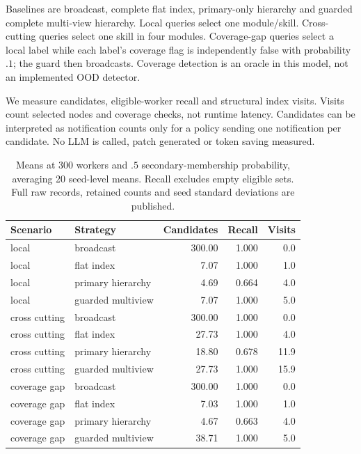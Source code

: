 \documentclass[11pt]{article}
\begin{document}
Baselines are broadcast, complete flat index, primary-only hierarchy and guarded complete multi-view hierarchy. Local queries select one module/skill. Cross-cutting queries select one skill in four modules. Coverage-gap queries select a local label while each label's coverage flag is independently false with probability $.1$; the guard then broadcasts. Coverage detection is an oracle in this model, not an implemented OOD detector.

We measure candidates, eligible-worker recall and structural index visits. Visits count selected nodes and coverage checks, not runtime latency. Candidates can be interpreted as notification counts only for a policy sending one notification per candidate. No LLM is called, patch generated or token saving measured.

\begin{table}[ht]\centering\small
\begin{tabularx}{\linewidth}{@{}XXrrr@{}}\toprule
Scenario & Strategy & Candidates & Recall & Visits \\\midrule
local & broadcast & 300.00 & 1.000 & 0.0 \\
local & flat index & 7.07 & 1.000 & 1.0 \\
local & primary hierarchy & 4.69 & 0.664 & 4.0 \\
local & guarded multiview & 7.07 & 1.000 & 5.0 \\
cross cutting & broadcast & 300.00 & 1.000 & 0.0 \\
cross cutting & flat index & 27.73 & 1.000 & 4.0 \\
cross cutting & primary hierarchy & 18.80 & 0.678 & 11.9 \\
cross cutting & guarded multiview & 27.73 & 1.000 & 15.9 \\
coverage gap & broadcast & 300.00 & 1.000 & 0.0 \\
coverage gap & flat index & 7.03 & 1.000 & 1.0 \\
coverage gap & primary hierarchy & 4.67 & 0.663 & 4.0 \\
coverage gap & guarded multiview & 38.71 & 1.000 & 5.0 \\
\bottomrule
\end{tabularx}\caption{Means at 300 workers and $.5$ secondary-membership probability, averaging 20 seed-level means. Recall excludes empty eligible sets. Full raw records, retained counts and seed standard deviations are published.}\label{tab:results}\end{table}
\end{document}
